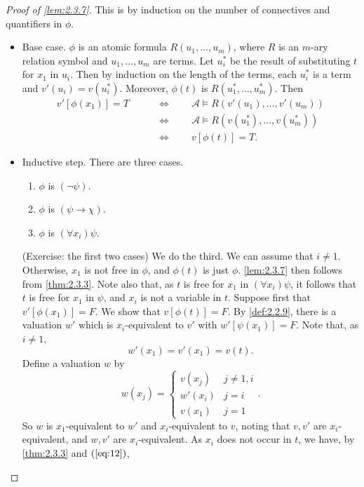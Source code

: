 \documentclass{article}
\newcommand{\A}{\mathcal{A}}
\newcommand{\rb}[1]{\left( #1 \right)}
\renewcommand{\sb}[1]{\left[ #1 \right]}
\newcommand{\notb}[1]{\rb{\neg #1}}
\newcommand{\impb}[2]{\rb{#1 \rightarrow #2}}
\newcommand{\fab}[1]{\rb{\forall #1}}
\theoremstyle{definition}\newtheorem{definition}{Definition}[subsection]
\theoremstyle{definition}\newtheorem{remark1}[definition]{Remark}
\theoremstyle{definition}\newtheorem{example1}[definition]{Example}
\theoremstyle{definition}\newtheorem*{remark2}{Remark}
\theoremstyle{definition}\newtheorem*{example2}{Example}
\theoremstyle{definition}\newtheorem*{note}{Note}
\theoremstyle{definition}\newtheorem*{notation}{Notation}
\begin{document}
\begin{proof}[Proof of \ref{lem:2.3.7}]
This is by induction on the number of connectives and quantifiers in $ \phi $.
\begin{itemize}
\item Base case. $ \phi $ is an atomic formula $ R\rb{u_1, \dots, u_m} $, where $ R $ is an $ m $-ary relation symbol and $ u_1, \dots, u_m $ are terms. Let $ u^*_i $ be the result of substituting $ t $ for $ x_1 $ in $ u_i $. Then by induction on the length of the terms, each $ u_i^* $ is a term and $ v'\rb{u_i} = v\rb{u_i^*} $. Moreover, $ \phi\rb{t} $ is $ R\rb{u_1^*, \dots, u_m^*} $. Then
\begin{align*}
v'\sb{\phi\rb{x_1}} = T \qquad
& \iff \qquad \A \vDash R\rb{v'\rb{u_1}, \dots, v'\rb{u_m}} \\
& \iff \qquad \A \vDash R\rb{v\rb{u_1^*}, \dots, v\rb{u_m^*}} \\
& \iff \qquad v\sb{\phi\rb{t}} = T.
\end{align*}
\item Inductive step. There are three cases.
\begin{enumerate}[leftmargin=0.5in, label=Case \arabic*.]
\item $ \phi $ is $ \notb{\psi} $.
\item $ \phi $ is $ \impb{\psi}{\chi} $.
\item $ \phi $ is $ \fab{x_i}\psi $.
\end{enumerate}
(Exercise: the first two cases) We do the third. We can assume that $ i \ne 1 $. Otherwise, $ x_1 $ is not free in $ \phi $, and $ \phi\rb{t} $ is just $ \phi $. \ref{lem:2.3.7} then follows from \ref{thm:2.3.3}. Note also that, as $ t $ is free for $ x_1 $ in $ \fab{x_i}\psi $, it follows that $ t $ is free for $ x_1 $ in $ \psi $, and $ x_i $ is not a variable in $ t $. Suppose first that $ v'\sb{\phi\rb{x_1}} = F $. We show that $ v\sb{\phi\rb{t}} = F $. By \ref{def:2.2.9}, there is a valuation $ w' $ which is $ x_i $-equivalent to $ v' $ with $ w'\sb{\psi\rb{x_1}} = F $. Note that, as $ i \ne 1 $,
\begin{equation}
\label{eq:12}
w'\rb{x_1} = v'\rb{x_1} = v\rb{t}.
\end{equation}
Define a valuation $ w $ by
$$ w\rb{x_j} = \begin{cases}
v\rb{x_j} & j \ne 1, i \\
w'\rb{x_i} & j = i \\
v\rb{x_1} & j = 1
\end{cases}. $$
So $ w $ is $ x_1 $-equivalent to $ w' $ and $ x_i $-equivalent to $ v $, noting that $ v, v' $ are $ x_i $-equivalent, and $ w, v' $ are $ x_i $-equivalent. As $ x_i $ does not occur in $ t $, we have, by \ref{thm:2.3.3} and $ \rb{\ref{eq:12}} $,

\end{itemize}
\end{proof}
\end{document}
